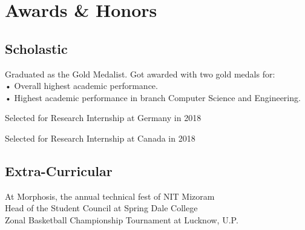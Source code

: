 
\section{Awards \& Honors} 
\subsection{Scholastic}
Graduated as the Gold Medalist. Got awarded with two gold medals for:\\
• Overall highest academic performance.\\
• Highest academic performance in branch Computer Science and Engineering.

Selected for Research Internship at Germany in 2018

Selected for Research Internship at Canada in 2018
\sectionsep

\subsection{Extra-Curricular}
At Morphosis, the annual technical fest of NIT Mizoram \\
Head of the Student Council at Spring Dale College \\
Zonal Basketball Championship Tournament at Lucknow, U.P. \\
\sectionsep